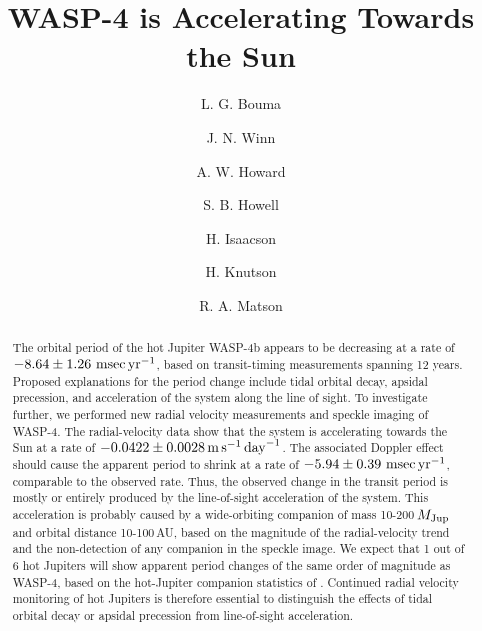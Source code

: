 \documentclass[12pt,twocolumn,tighten]{aastex62}
\begin{document}

\title{WASP-4 is Accelerating Towards the Sun}


%
%
\author[0000-0002-0514-5538]{L. G. Bouma}
%
\author[0000-0002-4265-047X]{J. N. Winn}

%
%
\author[0000-0001-8638-0320]{A. W. Howard}
%
\author{S. B. Howell}
%
\author[0000-0002-0531-1073]{H. Isaacson}
%
\author{H. Knutson}
%
\author{R. A. Matson}
%

\begin{abstract}
  The orbital period of the hot Jupiter WASP-4b appears to be decreasing at
  a rate of $-8.64 \pm 1.26~{\rm msec}\,{\rm yr}^{-1}$,
  based on transit-timing measurements spanning 12 years.
  Proposed explanations for the period change include
  tidal orbital decay, apsidal precession, and acceleration of the system
  along the line of sight.
  To investigate further, we performed new radial velocity measurements and
  speckle imaging of WASP-4.
  The radial-velocity data show that the system is
  accelerating towards the Sun at a rate of
  $-0.0422\pm 0.0028\,{\rm m}\,{\rm s}^{-1}\,{\rm day}^{-1}$.
  The associated Doppler effect should cause
  the apparent period to shrink at a rate of
  $-5.94 \pm 0.39~{\rm msec}\,{\rm yr}^{-1}$, comparable
  to the observed rate.
  Thus, the observed change in the transit period is mostly
  or entirely produced by the line-of-sight acceleration of the system.
  This acceleration is probably caused by a wide-orbiting companion
  of mass 10-200$\,M_{\rm Jup}$ and orbital distance 10-100$\,$AU,
  based on the magnitude of the radial-velocity trend and the non-detection of any
  companion in the speckle image.  We expect that 1 out of 6 hot Jupiters
  will show apparent period changes of the same order of magnitude as WASP-4,
  based on the hot-Jupiter companion statistics of  
  \citet{knutson_friends_2014}. Continued radial velocity
  monitoring of hot Jupiters is therefore essential to distinguish
  the effects of tidal orbital decay or apsidal precession from line-of-sight acceleration.
\end{abstract}
\end{document}
